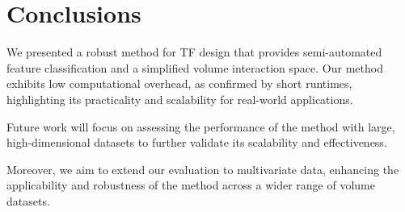 \section{Conclusions}
\label{sect:conclusions}

We presented a robust method for TF design that provides semi-automated feature classification and a simplified volume interaction space. Our method exhibits low computational overhead, as confirmed by short runtimes, highlighting its practicality and scalability for real-world applications.

Future work will focus on assessing the performance of the method with large, high-dimensional datasets to further validate its scalability and effectiveness.

Moreover, we aim to extend our evaluation to multivariate data, enhancing the applicability and robustness of the method across a wider range of volume datasets.
